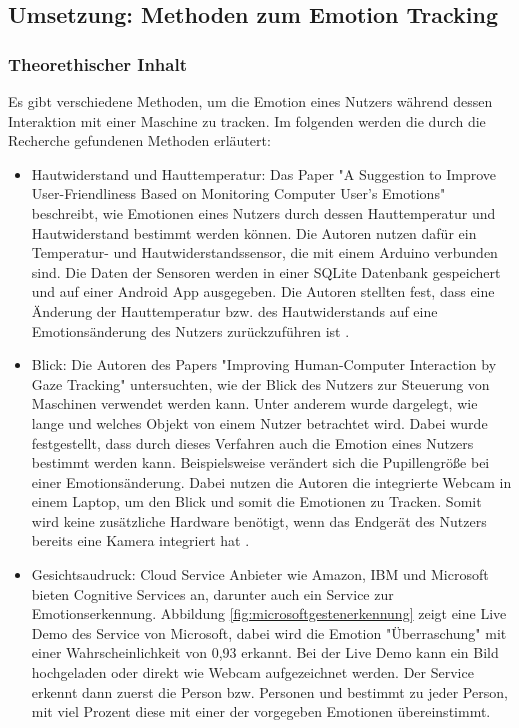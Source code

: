 \subsection{Umsetzung: Methoden zum Emotion Tracking} \label{MethodenEmotionTracking}
\subsubsection*{Theorethischer Inhalt}
Es gibt verschiedene Methoden, um die Emotion eines Nutzers während dessen Interaktion mit einer Maschine zu tracken. Im folgenden werden die durch die Recherche gefundenen  Methoden erläutert:

\begin{itemize}
\item Hautwiderstand und Hauttemperatur:
Das Paper "A Suggestion to Improve User-Friendliness Based
on Monitoring Computer User’s Emotions" beschreibt, wie Emotionen eines Nutzers durch dessen Hauttemperatur und Hautwiderstand bestimmt werden können. Die Autoren nutzen dafür ein Temperatur- und Hautwiderstandssensor, die mit einem Arduino verbunden sind. Die Daten der Sensoren werden in einer SQLite Datenbank gespeichert und auf einer Android App ausgegeben. Die Autoren stellten fest, dass eine Änderung der Hauttemperatur bzw. des Hautwiderstands  auf eine Emotionsänderung des Nutzers zurückzuführen ist \cite{EmotionTrackingGSR}.

\item Blick: Die Autoren des Papers "Improving Human-Computer Interaction
by Gaze Tracking" untersuchten, wie der Blick des Nutzers zur Steuerung von Maschinen verwendet werden kann. Unter anderem wurde dargelegt, wie lange und welches Objekt von einem Nutzer betrachtet wird. Dabei wurde festgestellt, dass durch dieses Verfahren auch die Emotion eines Nutzers bestimmt werden kann. Beispielsweise verändert sich die Pupillengröße bei einer Emotionsänderung. Dabei nutzen die Autoren die integrierte Webcam in einem Laptop, um den Blick und somit die Emotionen zu Tracken. Somit wird keine zusätzliche Hardware benötigt, wenn das Endgerät des Nutzers bereits eine Kamera integriert hat \cite{EmotionTrackingGaze}.

\item Gesichtsaudruck: Cloud Service Anbieter wie Amazon, IBM und Microsoft bieten Cognitive Services an, darunter auch ein Service zur Emotionserkennung. Abbildung \ref{fig:microsoftgestenerkennung} zeigt eine Live Demo des Service von Microsoft, dabei wird die Emotion "Überraschung" mit einer Wahrscheinlichkeit von 0,93 erkannt. Bei der Live Demo kann ein Bild hochgeladen oder direkt wie Webcam aufgezeichnet werden. Der Service erkennt dann zuerst die Person bzw. Personen und bestimmt zu jeder Person, mit viel Prozent diese mit einer der vorgegeben Emotionen übereinstimmt.


\end{itemize}

